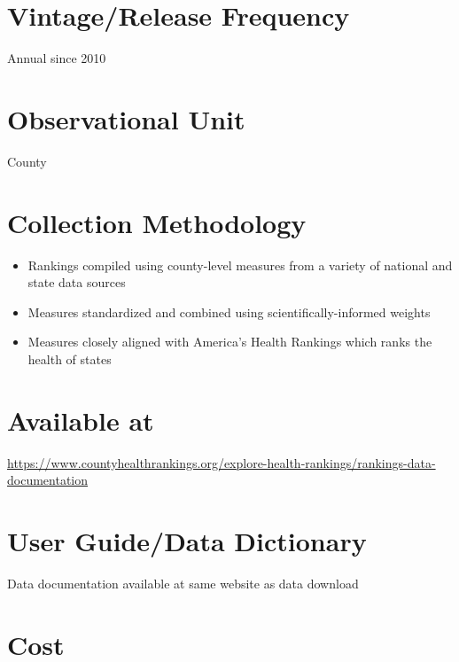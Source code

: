 \documentclass[
]{book}
\providecommand{\tightlist}{%
  \setlength{\itemsep}{0pt}\setlength{\parskip}{0pt}}
\begin{document}
\hypertarget{vintagerelease-frequency-20}{%
\section{Vintage/Release Frequency}\label{vintagerelease-frequency-20}}

Annual since 2010

\hypertarget{observational-unit-20}{%
\section{Observational Unit}\label{observational-unit-20}}

County

\hypertarget{collection-methodology-20}{%
\section{Collection Methodology}\label{collection-methodology-20}}

\begin{itemize}
\tightlist
\item
  Rankings compiled using county-level measures from a variety of national and state data sources
\item
  Measures standardized and combined using scientifically-informed weights
\item
  Measures closely aligned with America's Health Rankings which ranks the health of states
\end{itemize}

\hypertarget{available-at-20}{%
\section{Available at}\label{available-at-20}}

\url{https://www.countyhealthrankings.org/explore-health-rankings/rankings-data-documentation}

\hypertarget{user-guidedata-dictionary-20}{%
\section{User Guide/Data Dictionary}\label{user-guidedata-dictionary-20}}

Data documentation available at same website as data download

\hypertarget{cost-20}{%
\section{Cost}\label{cost-20}}
\end{document}
